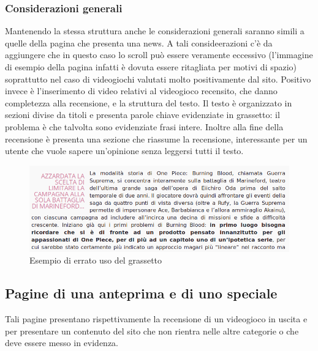 \documentclass[../ProgettoTecWeb2.tex]{subfiles}
\begin{document}
		\subsubsection{Considerazioni generali}
		Mantenendo la stessa struttura anche le considerazioni generali saranno simili a quelle della pagina che presenta una news. A tali consideerazioni c'è da aggiungere che in questo caso lo scroll può essere veramente eccessivo (l'immagine di esempio della pagina infatti è dovuta essere ritagliata per motivi di spazio) soprattutto nel caso di videogiochi valutati molto positivamente dal sito. Positivo invece è l'inserimento di video relativi al videogioco recensito, che danno completezza alla recensione, e la struttura del testo. Il testo è organizzato in sezioni divise da titoli e presenta parole chiave evidenziate in grassetto: il problema è che talvolta sono evidenziate frasi intere. Inoltre alla fine della recensione è presenta una sezione che riassume la recensione, interessante per un utente che vuole sapere un'opinione senza leggersi tutti il testo.
		\begin{figure} [H]
			\centering
			\includegraphics[scale=0.4]{img/ErratoUsoGrassetto}
			\caption{Esempio di errato uso del grassetto}
		\end{figure}

	\subsection{Pagine di una anteprima e di uno speciale}
	Tali pagine presentano rispettivamente la recensione di un videogioco in uscita e per presentare un contenuto del sito che non rientra nelle altre categorie o che deve essere messo in evidenza.
\end{document}
